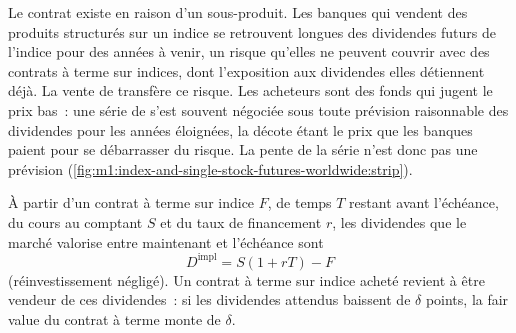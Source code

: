 Le contrat existe en raison d'un sous-produit. Les banques qui vendent des produits structurés
sur un indice se retrouvent longues des dividendes futurs de l'indice pour des années
à venir, un risque qu'elles ne peuvent couvrir avec des contrats à terme sur indices, dont l'exposition aux dividendes
elles détiennent déjà. La vente de  transfère ce risque. Les acheteurs sont
des fonds qui jugent le prix bas~: une série de  s'est souvent négociée
sous toute prévision raisonnable des dividendes pour les années éloignées, la
décote étant le prix que les banques paient pour se débarrasser du risque. La pente de la série
n'est donc pas une prévision (\cref{fig:m1:index-and-single-stock-futures-worldwide:strip}).

\begin{proposition}\label{prop:m1:index-and-single-stock-futures-worldwide:implied}
À partir d'un contrat à terme sur indice $F$, de temps $T$ restant avant l'échéance, du cours au comptant $S$ et du taux de financement
$r$, les dividendes que le marché valorise entre maintenant et l'échéance sont
\[
D^{\text{impl}} = S(1+rT) - F
\]
(réinvestissement négligé). Un contrat à terme sur indice acheté revient à être vendeur de ces dividendes~: si
les dividendes attendus baissent de $\delta$ points, la fair value du contrat à terme monte de
$\delta$.
\end{proposition}

\begin{omfigure}

\label{fig:m1:index-and-single-stock-futures-worldwide:strip}
\end{omfigure}

